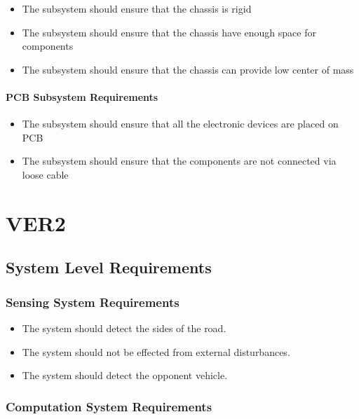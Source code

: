 \documentclass[a4paper,12pt]{article}
\begin{document}
			\begin{itemize}
			\item The subsystem should ensure that the chassis is rigid 
			\item The subsystem should ensure that the chassis have enough space for components
			\item The subsystem should ensure that the chassis can provide low center of mass 

		\end{itemize}
		
	\paragraph{PCB Subsystem Requirements}
	
		\begin{itemize}
			\item The subsystem should ensure that all the electronic devices are placed on PCB
			\item The subsystem should ensure that the components are not connected via loose cable 	
		\end{itemize}	



	
		
\newpage
\section{VER2}

	\subsection{System Level Requirements}
	
		\subsubsection{Sensing System Requirements}
	
			\begin{itemize}
				\item The system should detect the sides of the road.
				\item The system should not be effected from external disturbances.
				\item The system should detect the opponent vehicle.
			\end{itemize}

	
		
		\subsubsection{Computation System Requirements}
		
\end{document}
